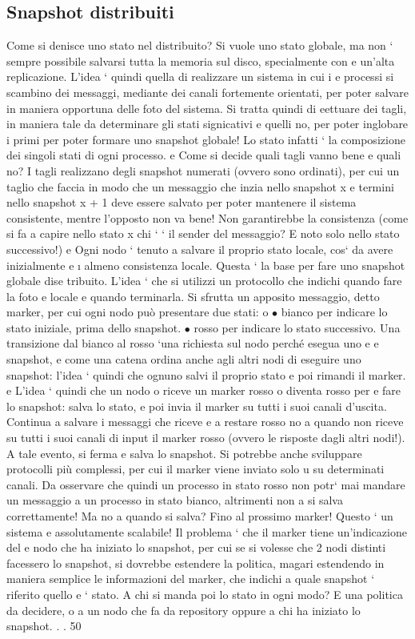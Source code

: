 \documentclass[a4paper,12pt]{article}
\begin{document}
\subsection{Snapshot distribuiti}
Come si denisce uno stato nel distribuito? Si vuole uno stato globale, ma
non ` sempre possibile salvarsi tutta la memoria sul disco, specialmente con
e
un'alta replicazione. L'idea ` quindi quella di realizzare un sistema in cui i
e
processi si scambino dei messaggi, mediante dei canali fortemente orientati, per
poter salvare in maniera opportuna delle foto del sistema. Si tratta quindi di
eettuare dei tagli, in maniera tale da determinare gli stati signicativi e quelli
no, per poter inglobare i primi per poter formare uno snapshot globale! Lo stato
infatti ` la composizione dei singoli stati di ogni processo.
e
Come si decide quali tagli vanno bene e quali no? I tagli realizzano degli
snapshot numerati (ovvero sono ordinati), per cui un taglio che faccia in modo
che un messaggio che inzia nello snapshot x e termini nello snapshot x + 1 deve
essere salvato per poter mantenere il sistema consistente, mentre l'opposto non
va bene! Non garantirebbe la consistenza (come si fa a capire nello stato x chi
`
` il sender del messaggio? E noto solo nello stato successivo!)
e
Ogni nodo ` tenuto a salvare il proprio stato locale, cos` da avere inizialmente
e
\i{}
almeno consistenza locale. Questa ` la base per fare uno snapshot globale dise
tribuito. L'idea ` che si utilizzi un protocollo che indichi quando fare la foto
e
locale e quando terminarla. Si sfrutta un apposito messaggio, detto marker, per
cui ogni nodo può presentare due stati:
o
$\bullet$ bianco per indicare lo stato iniziale, prima dello snapshot.
$\bullet$ rosso per indicare lo stato successivo.
Una transizione dal bianco al rosso `una richiesta sul nodo perché esegua uno
e
e
snapshot, e come una catena ordina anche agli altri nodi di eseguire uno snapshot: l'idea ` quindi che ognuno salvi il
proprio stato e poi rimandi il marker.
e
L'idea ` quindi che un nodo o riceve un marker rosso o diventa rosso per
e
fare lo snapshot: salva lo stato, e poi invia il marker su tutti i suoi canali
d'uscita. Continua a salvare i messaggi che riceve e a restare rosso no a quando
non riceve su tutti i suoi canali di input il marker rosso (ovvero le risposte
dagli altri nodi!). A tale evento, si ferma e salva lo snapshot. Si potrebbe
anche sviluppare protocolli più complessi, per cui il marker viene inviato solo
u
su determinati canali. Da osservare che quindi un processo in stato rosso non
potr` mai mandare un messaggio a un processo in stato bianco, altrimenti non
a
si salva correttamente!
Ma no a quando si salva? Fino al prossimo marker! Questo ` un sistema
e
assolutamente scalabile! Il problema ` che il marker tiene un'indicazione del
e
nodo che ha iniziato lo snapshot, per cui se si volesse che 2 nodi distinti facessero
lo snapshot, si dovrebbe estendere la politica, magari estendendo in maniera
semplice le informazioni del marker, che indichi a quale snapshot ` riferito quello
e
`
stato. A chi si manda poi lo stato in ogni modo? E una politica da decidere, o
a un nodo che fa da repository oppure a chi ha iniziato lo snapshot. . .
50
\end{document}
